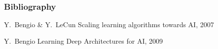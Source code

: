 \begin{frame}[allowframebreaks]
  \frametitle<presentation>{Bibliography}    
  \begin{thebibliography}{10}   
	\beamertemplatearticlebibitems
	\bibitem{}
	Y.~Bengio \& Y.~LeCun
	\newblock Scaling learning algorithms towards AI, 2007
	
	\beamertemplatearticlebibitems
	\bibitem{}
	Y.~Bengio
	\newblock Learning Deep Architectures for AI, 2009
  \end{thebibliography}
\end{frame}
